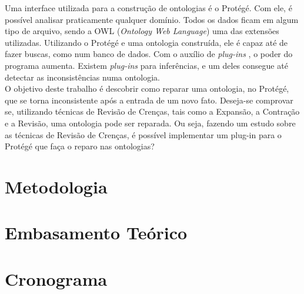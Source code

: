 \documentclass[12pt,letterpaper]{article}
\begin{document}
	Uma interface utilizada para a construção de ontologias é o Protégé. Com ele, é possível analisar praticamente qualquer domínio. Todos os dados ficam em algum tipo de arquivo, sendo a OWL (\textit{Ontology Web Language}) uma das extensões utilizadas. Utilizando o Protégé e uma ontologia construída, ele é capaz até de fazer buscas, como num banco de dados. Com o auxílio de \textit{plug-ins} \cite{resina2014belief} \cite{ribeiro2008}, o poder do programa aumenta. Existem \textit{plug-ins} para inferências, e um deles consegue até detectar as inconsistências \cite{cobe2014ontology} numa ontologia. \\
	
	O objetivo deste trabalho é descobrir como reparar uma ontologia, no Protégé, que se torna inconsistente após a entrada de um novo fato. Deseja-se comprovar se, utilizando técnicas de Revisão de Crenças, tais como a Expansão, a Contração e a Revisão, uma ontologia pode ser reparada. Ou seja, fazendo um estudo sobre as técnicas de Revisão de Crenças, é possível implementar um plug-in para o Protégé que faça o reparo nas ontologias? \\
	
	\clearpage
	
	\section{Metodologia}
	
	\section{Embasamento Teórico}
	
	\section{Cronograma}
	
	
	
	 
\end{document}
